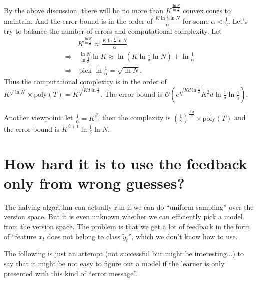 \documentclass{article}
\begin{document}
By the above discussion, there will be no more than $K^{\frac{\ln N}{\ln \frac{1}{\alpha}}}$ convex cones to maintain. And the error bound is in the order of $\frac{K\ln\frac{1}{\delta}\ln N}{\alpha}$ for some $\alpha<\frac{1}{2}$. Let's try to balance the number of errors and computational complexity. Let
\begin{align*}
    &K^{\frac{\ln N}{\ln \frac{1}{\alpha}}}\approx\frac{K\ln\frac{1}{\delta}\ln N}{\alpha}\\
    \Rightarrow &~ \frac{\ln N}{\ln\frac{1}{\alpha}} \ln K \approx  \ln\left(K\ln\frac{1}{\delta}\ln N\right) + \ln\frac{1}{\alpha}\\
    \Rightarrow &~ \text{pick\ }\ln\frac{1}{\alpha}=\sqrt{\ln N}.
\end{align*}
Thus the computational complexity is in the order of $K^{\sqrt{\ln N}}\times \text{poly}(T)=K^{\sqrt{Kd\ln\frac{1}{\delta}}}$. The error bound is $\mathcal{O}\left( e^{\sqrt{Kd\ln \frac{1}{\delta}}} K^2 d \ln\frac{1}{\delta}\ln\frac{1}{\gamma} \right)$.

Another viewpoint: let $\frac{1}{\alpha}=K^\beta$, then the complexity is $\left(\frac{1}{\gamma}\right)^{\frac{Kd}{\beta}}\times \text{poly}(T)$ and the error bound is $K^{\beta+1}\ln\frac{1}{\delta}\ln N$. 

\section{How hard it is to use the feedback only from wrong guesses?}
The halving algorithm can actually run if we can do ``uniform sampling'' over the version space. But it is even unknown whether we can efficiently pick a model from the version space. The problem is that we get a lot of feedback in the form of ``feature $x_t$ does not belong to class $\tilde{y}_t$'', which we don't know how to use. 

The following is just an attempt (not successful but might be interesting...) to say that it might be not easy to figure out a model if the learner is only presented with this kind of ``error message''. 
\end{document}
